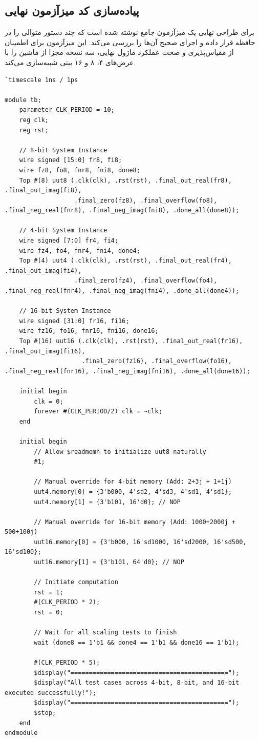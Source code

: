 \documentclass[11pt,a4paper]{article}
\begin{document}
\subsection{پیاده‌سازی کد میزآزمون نهایی}
برای طراحی نهایی یک میزآزمون جامع نوشته شده است که چند دستور متوالی را در حافظه قرار داده و اجرای صحیح آن‌ها را بررسی می‌کند. این میزآزمون برای اطمینان از مقیاس‌پذیری و صحت عملکرد ماژول نهایی، سه نسخه مجزا از ماشین را با عرض‌های ۴، ۸ و ۱۶ بیتی شبیه‌سازی می‌کند.
\begin{LTR}
\begin{lstlisting}[title={\rl{کد میزآزمون نهایی سیستم}}]
`timescale 1ns / 1ps

module tb;
    parameter CLK_PERIOD = 10;
    reg clk;
    reg rst;

    // 8-bit System Instance
    wire signed [15:0] fr8, fi8;
    wire fz8, fo8, fnr8, fni8, done8;
    Top #(8) uut8 (.clk(clk), .rst(rst), .final_out_real(fr8), .final_out_imag(fi8),
                   .final_zero(fz8), .final_overflow(fo8), .final_neg_real(fnr8), .final_neg_imag(fni8), .done_all(done8));

    // 4-bit System Instance
    wire signed [7:0] fr4, fi4;
    wire fz4, fo4, fnr4, fni4, done4;
    Top #(4) uut4 (.clk(clk), .rst(rst), .final_out_real(fr4), .final_out_imag(fi4),
                   .final_zero(fz4), .final_overflow(fo4), .final_neg_real(fnr4), .final_neg_imag(fni4), .done_all(done4));

    // 16-bit System Instance
    wire signed [31:0] fr16, fi16;
    wire fz16, fo16, fnr16, fni16, done16;
    Top #(16) uut16 (.clk(clk), .rst(rst), .final_out_real(fr16), .final_out_imag(fi16),
                     .final_zero(fz16), .final_overflow(fo16), .final_neg_real(fnr16), .final_neg_imag(fni16), .done_all(done16));

    initial begin
        clk = 0;
        forever #(CLK_PERIOD/2) clk = ~clk;
    end

    initial begin
        // Allow $readmemh to initialize uut8 naturally
        #1;
        
        // Manual override for 4-bit memory (Add: 2+3j + 1+1j)
        uut4.memory[0] = {3'b000, 4'sd2, 4'sd3, 4'sd1, 4'sd1};
        uut4.memory[1] = {3'b101, 16'd0}; // NOP

        // Manual override for 16-bit memory (Add: 1000+2000j + 500+100j)
        uut16.memory[0] = {3'b000, 16'sd1000, 16'sd2000, 16'sd500, 16'sd100};
        uut16.memory[1] = {3'b101, 64'd0}; // NOP

        // Initiate computation
        rst = 1;
        #(CLK_PERIOD * 2);
        rst = 0;

        // Wait for all scaling tests to finish
        wait (done8 == 1'b1 && done4 == 1'b1 && done16 == 1'b1);
        
        #(CLK_PERIOD * 5);
        $display("===========================================");
        $display("All test cases across 4-bit, 8-bit, and 16-bit executed successfully!");
        $display("===========================================");
        $stop;
    end
endmodule
\end{lstlisting}
\end{LTR}
\end{document}
